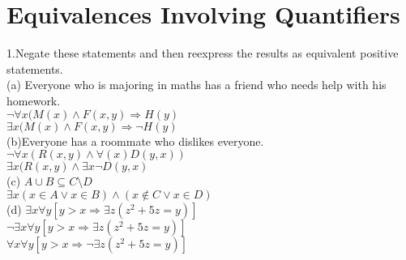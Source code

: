 \documentclass{article}
\begin{document}
\section*{Equivalences Involving Quantifiers}
1.Negate these statements and then reexpress the results as equivalent positive statements.\\
(a) Everyone who is majoring in maths has a friend who needs help with his homework.\\
$\neg \forall x(M(x) \wedge F(x,y) \Rightarrow H(y)$\\
$\exists x(M(x) \wedge F(x,y) \Rightarrow \neg H(y)$\\
(b)Everyone has a roommate who dislikes everyone.\\
$\neg \forall x(R(x,y) \wedge \forall(x)D(y,x))$\\
$\exists x (R(x,y) \wedge \exists x \neg D(y,x)$\\
(c) $A \cup B \subseteq C \setminus D$\\
$\exists x(x \in A \vee x \in B) \wedge (x \not \in C \vee x \in D) $\\
(d) $\exists x \forall y[y > x \Rightarrow \exists z(z^2 + 5z = y)]$\\
$\neg \exists x \forall y[y > x \Rightarrow \exists z(z^2 + 5z = y)]$\\
$\forall x \forall y[y > x \Rightarrow \neg\exists z(z^2 + 5z = y)]$
\end{document}
